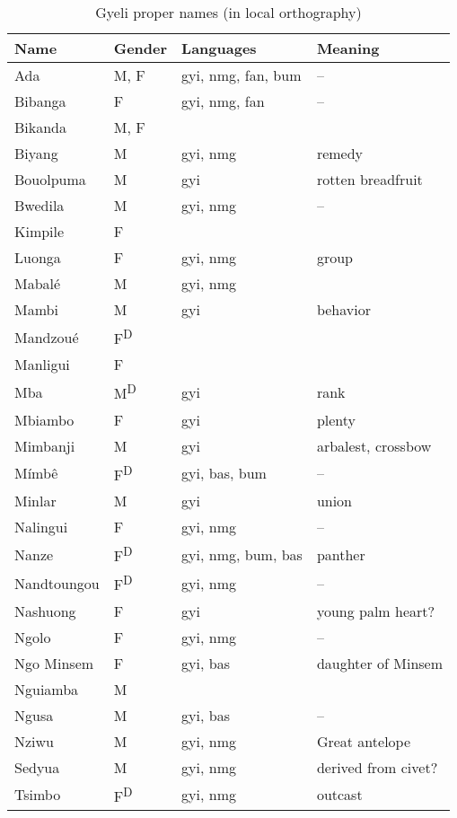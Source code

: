 \begin{table} 
\begin{tabular}{p{2.5cm}|lll}
Name  & Gender & Languages & Meaning	\\

 \midrule
Ada & M, F & gyi, nmg, fan, bum & -- 				 \\
Bibanga & F & gyi, nmg, fan & -- 			 \\
Bikanda & M, F & & 			\\
Biyang & M & gyi, nmg & remedy			 \\
Bouolpuma & M & gyi & rotten breadfruit 			\\
Bwedila%
 & M & gyi, nmg 	& -- 			 \\
Kimpile & F & & 			\\
Luonga & F & gyi, nmg & group		 \\
Mabalé & M & gyi, nmg & 			 \\
Mambi & M & gyi & behavior 			\\
Mandzoué & F\textsuperscript{D} & & 			\\
Manligui & F & & 			\\
Mba & M\textsuperscript{D} & gyi & rank 				 \\
Mbiambo & F & gyi & plenty 			 \\
Mimbanji%
& M & gyi & arbalest, crossbow 	 \\
Mímbê & F\textsuperscript{D} & gyi, bas, bum & -- 			 \\
Minlar & M & gyi & union 		 \\
Nalingui & F & gyi, nmg & -- 	\\
Nanze & F\textsuperscript{D} & gyi, nmg, bum, bas &	panther		\\
Nandtoungou & F\textsuperscript{D} & gyi, nmg & --		\\
Nashuong & F & gyi & young palm heart?	\\
Ngolo & F & gyi, nmg & --				\\
Ngo Minsem & F & gyi, bas & daughter of Minsem		\\
Nguiamba & M & &					\\
Ngusa & M & gyi, bas & -- 		\\
Nziwu & M & gyi, nmg & Great antelope			\\
Sedyua%
& M & gyi, nmg & derived from civet?	\\
Tsimbo & F\textsuperscript{D} & gyi, nmg &	outcast	\\
 \midrule				
\end{tabular}
\caption{Gyeli proper names (in local orthography)}
\label{Tab:PN}
\end{table}



